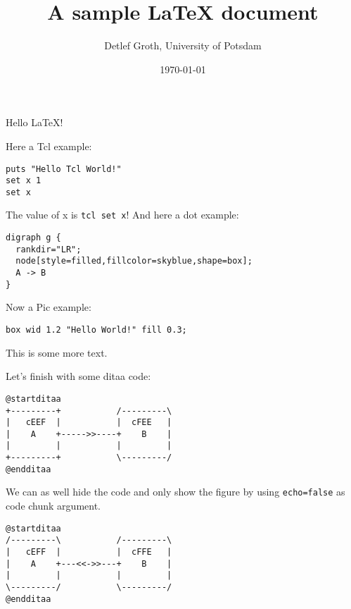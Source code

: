 \documentclass{article}
\title{A sample LaTeX document}
\author{Detlef Groth, University of Potsdam}
\date{\today}
\begin{document}
\maketitle

Hello LaTeX!

Here a Tcl example:

\begin{Verbatim}[filter=tcl,label=test,echo=true,eval=true]
puts "Hello Tcl World!"
set x 1
set x
\end{Verbatim}

The value of x is \texttt{tcl set x}!
And here a dot example:

\begin{Verbatim}[filter=dot,eval=true]
digraph g {
  rankdir="LR";
  node[style=filled,fillcolor=skyblue,shape=box];
  A -> B
}
\end{Verbatim}

Now a Pic example:

\begin{Verbatim}[filter=pic,eval=true]
    box wid 1.2 "Hello World!" fill 0.3;
\end{Verbatim}
    
This is some more text.

Let's finish with some ditaa code:

\begin{Verbatim}[filter=puml,eval=true,ext=png]
@startditaa
+---------+           /---------\
|   cEEF  |           |  cFEE   |
|    A    +----->>----+    B    |
|         |           |         |
+---------+           \---------/
@endditaa
\end{Verbatim}

We can as well hide the code and only show the figure by using
\texttt{echo=false} as code chunk argument.

\begin{Verbatim}[filter=puml,eval=true,echo=false]
@startditaa
/---------\           /---------\
|   cEFF  |           |  cFFE   |
|    A    +---<<->>---+    B    |
|         |           |         |
\---------/           \---------/
@endditaa
\end{Verbatim}
\end{document}
